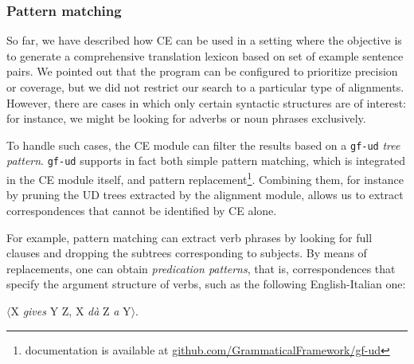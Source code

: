 \documentclass[11pt]{article}
\begin{document}
\subsubsection{Pattern matching}
So far, we have described how CE can be used in a setting where the objective is to generate a comprehensive translation lexicon based on set of example sentence pairs.
We pointed out that the program can be configured to prioritize precision or coverage, but we did not restrict our search to a particular type of alignments.
However, there are cases in which only certain syntactic structures are of interest: for instance, we might be looking for adverbs or noun phrases exclusively.

To handle such cases, the CE module can filter the results based on a \texttt{gf-ud} \textit{tree pattern}.
\texttt{gf-ud} supports in fact both simple pattern matching, which is integrated in the CE module itself, and pattern replacement\footnote{documentation is available at \url{github.com/GrammaticalFramework/gf-ud}}.
Combining them, for instance by pruning the UD trees extracted by the alignment module, allows us to extract correspondences that cannot be identified by CE alone. 

For example, pattern matching can extract verb phrases by looking for full clauses and dropping the subtrees corresponding to subjects. 
By means of replacements, one can obtain \textit{predication patterns}, that is, correspondences that specify the argument structure of verbs, such as the following English-Italian one:

\smallskip
$\langle$X \textit{gives} Y Z, X \textit{dà} Z \textit{a} Y$\rangle$.
\end{document}

